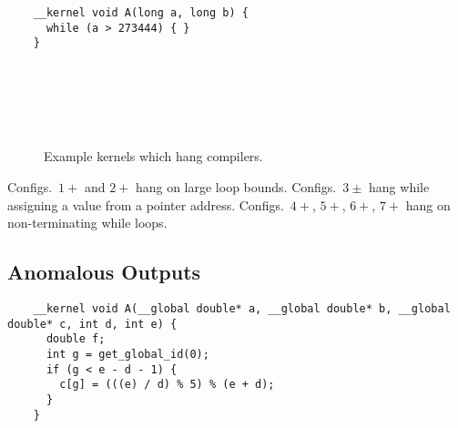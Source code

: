 \newsavebox{\IntelOptLoopHang}
\begin{lrbox}{\IntelOptLoopHang}
  \hspace{1.5em}
  \begin{lstlisting}
    __kernel void A(long a, long b) {
      while (a > 273444) { }
    }
  \end{lstlisting}
\end{lrbox}


\begin{figure}
  \centering %
  \\%
  \\%
  \\%
  \\%
  \caption{Example kernels which hang compilers.}%
  \label{lst:compiler-hangs}%
\end{figure}

Configs.\ $1+$ and $2+$ hang on large loop bounds. Configs.\ $3\pm$ hang while assigning a value from a pointer address. Configs.\ $4+$, $5+$, $6+$, $7+$ hang on non-terminating while loops.


\subsection{Anomalous Outputs}

\newsavebox{\IntelSizetInt}
\begin{lrbox}{\IntelSizetInt}
  \hspace{1.5em}
  \begin{lstlisting}
    __kernel void A(__global double* a, __global double* b, __global double* c, int d, int e) {
      double f;
      int g = get_global_id(0);
      if (g < e - d - 1) {
        c[g] = (((e) / d) % 5) % (e + d);
      }
    }
  \end{lstlisting}
\end{lrbox}

